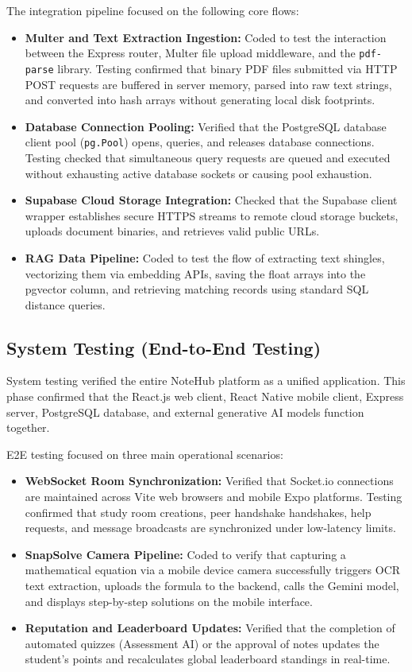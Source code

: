 \documentclass[12,Times new Roman,a4paper]{report}
\begin{document}
The integration pipeline focused on the following core flows:
\begin{itemize}
    \item \textbf{Multer and Text Extraction Ingestion:} Coded to test the interaction between the Express router, Multer file upload middleware, and the \texttt{pdf-parse} library. Testing confirmed that binary PDF files submitted via HTTP POST requests are buffered in server memory, parsed into raw text strings, and converted into hash arrays without generating local disk footprints.
    \item \textbf{Database Connection Pooling:} Verified that the PostgreSQL database client pool (\texttt{pg.Pool}) opens, queries, and releases database connections. Testing checked that simultaneous query requests are queued and executed without exhausting active database sockets or causing pool exhaustion.
    \item \textbf{Supabase Cloud Storage Integration:} Checked that the Supabase client wrapper establishes secure HTTPS streams to remote cloud storage buckets, uploads document binaries, and retrieves valid public URLs.
    \item \textbf{RAG Data Pipeline:} Coded to test the flow of extracting text shingles, vectorizing them via embedding APIs, saving the float arrays into the pgvector column, and retrieving matching records using standard SQL distance queries.
\end{itemize}

\subsection{System Testing (End-to-End Testing)}
System testing verified the entire NoteHub platform as a unified application. This phase confirmed that the React.js web client, React Native mobile client, Express server, PostgreSQL database, and external generative AI models function together.

E2E testing focused on three main operational scenarios:
\begin{itemize}
    \item \textbf{WebSocket Room Synchronization:} Verified that Socket.io connections are maintained across Vite web browsers and mobile Expo platforms. Testing confirmed that study room creations, peer handshake handshakes, help requests, and message broadcasts are synchronized under low-latency limits.
    \item \textbf{SnapSolve Camera Pipeline:} Coded to verify that capturing a mathematical equation via a mobile device camera successfully triggers OCR text extraction, uploads the formula to the backend, calls the Gemini model, and displays step-by-step solutions on the mobile interface.
    \item \textbf{Reputation and Leaderboard Updates:} Verified that the completion of automated quizzes (Assessment AI) or the approval of notes updates the student's points and recalculates global leaderboard standings in real-time.
\end{itemize}
\end{document}
